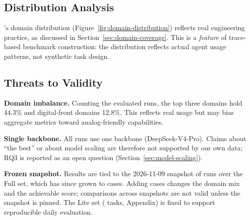 \subsection{Distribution Analysis}
\label{sec:distribution}

\bench's domain distribution (Figure~\ref{fig:domain-distribution}) reflects real engineering practice, as discussed in Section~\ref{sec:domain-coverage}. This is a \emph{feature} of trace-based benchmark construction: the distribution reflects actual agent usage patterns, not synthetic task design.

\subsection{Threats to Validity}
\label{sec:threats}

\textbf{Domain imbalance.} Counting the \Neval{} evaluated runs, the top three domains hold 44.3\% and digital-front domains 12.8\%. This reflects real usage but may bias aggregate metrics toward analog-friendly capabilities.

\textbf{Single backbone.} All \Neval{} runs use one backbone (DeepSeek-V4-Pro). Claims about ``the best'' or about model scaling are therefore not supported by our own data; RQ3 is reported as an open question (Section~\ref{sec:model-scaling}).

\textbf{Frozen snapshot.} Results are tied to the 2026-11-09 snapshot of \Neval{} runs over the Full set, which has since grown to \Ntasks{} cases. Adding cases changes the domain mix and the achievable score; comparisons across snapshots are not valid unless the snapshot is pinned. The Lite set (\LiteSet{} tasks, Appendix) is fixed to support reproducible daily evaluation.

